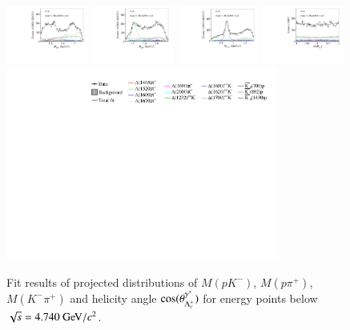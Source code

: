 \begin{figure}[htbp]
    \includegraphics[width=0.24\textwidth]{figure/pwa_nominal/s6_m_R_BC.pdf}
    \includegraphics[width=0.24\textwidth]{figure/pwa_nominal/s6_m_R_BD.pdf}
    \includegraphics[width=0.24\textwidth]{figure/pwa_nominal/s6_m_R_CD.pdf}
    \includegraphics[width=0.24\textwidth]{figure/pwa_nominal/s6_epemDSID_Lmdc_cos_beta.pdf} \\
    \includegraphics[width=0.80\textwidth]{figure/pwa_nominal/legend.pdf}

    \caption{Fit results of projected distributions of $M(pK^-)$, $M(p\pi^+)$, $M(K^-\pi^+)$  and helicity angle $\cos(\theta_{\Lambda_{c}^{+}}^{\gamma^*})$ for energy points below $\sqrt{s} = 4.740\gev/c^2$. }
\label{fig:pwa_fit_mass_0}
\end{figure}

